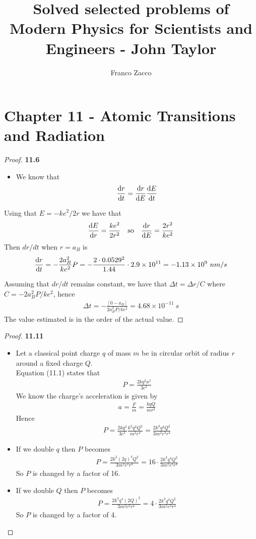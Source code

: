 \documentclass[11pt]{article}
\title{\textbf{Solved selected problems of Modern Physics for Scientists and Engineers - John Taylor}}
\author{Franco Zacco}
\date{}
\newcommand{\sci}[1]{\times 10^{#1}}
\theoremstyle{definition}
\begin{document}
\maketitle
\thispagestyle{empty}

\section*{Chapter 11 - Atomic Transitions and Radiation}

\begin{proof}{\textbf{11.6}}
\begin{itemize}
\item [\textbf{(a)}] We know that
$$\dv{r}{t} = \dv{r}{E}\dv{E}{t}$$
\end{itemize}
Using that $E = -ke^2/2r$ we have that
\begin{align*}
    \dv{E}{r} = \frac{ke^2}{2r^2}
    \quad\text{so}\quad
    \dv{r}{E} = \frac{2r^2}{ke^2}
\end{align*}
Then $dr/dt$ when $r = a_B$ is
$$\dv{r}{t} = -\frac{2a_B^2}{ke^2}P
= -\frac{2 \cdot 0.0529^2}{1.44}\cdot 2.9\sci{11}
= -1.13\sci{9}~nm/s
$$
\item [\textbf{(b)}] Assuming that $dr/dt$ remains constant, we have that
$\Delta t = \Delta r/C$ where $C = -2a_B^2P/ke^2$, hence
\begin{align*}
    \Delta t = -\frac{[0 - a_B]}{2a_B^2P/ke^2}
    = 4.68\sci{-11}~s
\end{align*}
The value estimated is in the order of the actual value.
\end{proof}

\cleardoublepage
\begin{proof}{\textbf{11.11}}
\begin{itemize}
\item [\textbf{(a)}] Let a classical point charge $q$ of mass $m$ be in 
circular orbit of radius $r$ around a fixed charge $Q$.\\
Equation (11.1) states that
\begin{align*}
    P = \frac{2kq^2a^2}{3c^3}
\end{align*}
We know the charge's acceleration is given by
\begin{align*}
    a = \frac{F}{m} = \frac{kqQ}{mr^2}
\end{align*}
Hence
\begin{align*}
    P = \frac{2kq^2}{3c^3}\frac{k^2q^2Q^2}{m^2r^4}
    =\frac{2k^3q^4Q^2}{3m^2c^3r^4}
\end{align*}
\item [\textbf{(b)}] If we double $q$ then $P$ becomes
\begin{align*}
    P = \frac{2k^3(2q)^4Q^2}{3m^2c^3r^4} = 16\cdot\frac{2k^3q^4Q^2}{3m^2c^3r^4}
\end{align*}
So $P$ is changed by a factor of 16.
\item [\textbf{(c)}] If we double $Q$ then $P$ becomes
\begin{align*}
    P = \frac{2k^3q^4(2Q)^2}{3m^2c^3r^4} = 4\cdot\frac{2k^3q^4Q^2}{3m^2c^3r^4}
\end{align*}
So $P$ is changed by a factor of 4.
\end{itemize}
\end{proof}
\end{document}
